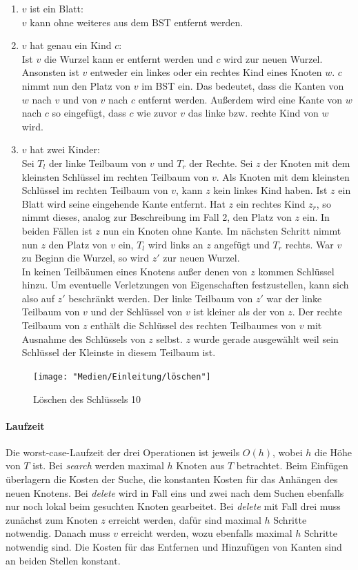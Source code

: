 \documentclass[a4paper,12pt]{article}
\begin{document}
\begin{enumerate}
	\item $v$ ist ein Blatt: \\
	$v$ kann ohne weiteres aus dem BST entfernt werden.
	\item $v$ hat genau ein Kind $c$:\\
	Ist $v$ die Wurzel kann er entfernt werden und $c$ wird zur neuen Wurzel. Ansonsten ist $v$ entweder ein linkes oder ein rechtes Kind eines Knoten $w$. $c$ nimmt nun den Platz von $v$ im BST ein. Das bedeutet, dass die Kanten von $w$ nach $v$ und von $v$ nach $c$ entfernt werden. Außerdem wird eine Kante von $w$ nach $c$ so eingefügt, dass $c$ wie zuvor $v$ das linke bzw. rechte Kind von $w$ wird. 
	\item $v$ hat zwei Kinder:\\
	Sei $T_l$ der linke Teilbaum von $v$ und $T_r$ der Rechte.
	Sei $z$ der Knoten mit dem kleinsten Schlüssel im rechten Teilbaum von $v$. Als Knoten mit dem kleinsten Schlüssel im rechten Teilbaum von $v$, kann $z$ kein linkes Kind haben. Ist $z$ ein Blatt wird seine eingehende Kante entfernt. Hat $z$ ein rechtes Kind $z_r$, so nimmt dieses, analog zur Beschreibung im Fall 2, den Platz von $z$ ein. In beiden Fällen ist $z$ nun ein Knoten ohne Kante. Im nächsten Schritt nimmt nun $z$ den Platz von $v$ ein, $T_l$ wird links an $z$ angefügt und $T_r$ rechts. War $v$ zu Beginn die Wurzel, so wird $z'$ zur neuen Wurzel.\\
	In keinen Teilbäumen eines Knotens außer denen von $z$ kommen Schlüssel hinzu. Um eventuelle Verletzungen von Eigenschaften festzustellen, kann sich also auf $z'$ beschränkt werden. Der linke Teilbaum von $z'$ war der linke Teilbaum von $v$ und der Schlüssel von $v$ ist kleiner als der von $z$. Der rechte Teilbaum von $z$ enthält die Schlüssel des rechten Teilbaumes von $v$ mit Ausnahme des Schlüssels von $z$ selbst. $z$ wurde gerade ausgewählt weil sein Schlüssel der Kleinste in diesem Teilbaum ist. 
	
	
	
	
\end{enumerate} 
\begin{figure}[h]
	\centering
	\texttt{[image: "Medien/Einleitung/löschen"]}
	\caption{Löschen des Schlüssels 10}
	\label{fig:löschen}
\end{figure}
\paragraph{Laufzeit}
Die worst-case-Laufzeit der drei Operationen ist jeweils $\mathit{O(h)}$, wobei $h$ die Höhe von $T$ ist. Bei \textit{search} werden maximal $h$ Knoten aus $T$ betrachtet. Beim Einfügen überlagern die Kosten der Suche, die konstanten Kosten für das Anhängen des neuen Knotens. Bei \textit{delete} wird in Fall eins und zwei nach dem Suchen ebenfalls nur noch lokal beim gesuchten Knoten gearbeitet. Bei \textit{delete} mit Fall drei muss zunächst zum Knoten $z$ erreicht werden, dafür sind maximal $h$ Schritte notwendig. Danach muss $v$ erreicht werden, wozu ebenfalls maximal $h$ Schritte notwendig sind. Die Kosten für das Entfernen und Hinzufügen von Kanten sind an beiden Stellen konstant.  
\end{document}
